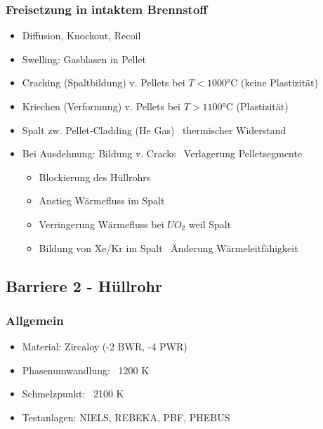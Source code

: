 \documentclass[12pt]{article}
\begin{document}
\subsubsection{Freisetzung in intaktem Brennstoff}
\begin{itemize}
	\item Diffusion, Knockout, Recoil
	\item Swelling: Gasblasen in Pellet
	\item Cracking (Spaltbildung) v. Pellets bei \(T < 1000\)°C (keine Plastizität)
	\item Kriechen (Verformung) v. Pellets bei \(T > 1100\)°C (Plastizität)
	\item Spalt zw. Pellet-Cladding (He Gas) \textrightarrow\ thermischer Widerstand
	\item Bei Ausdehnung: Bildung v. Cracks \textrightarrow\ Verlagerung Pelletsegmente
		\begin{itemize}
			\item Blockierung des Hüllrohrs
			\item Anstieg Wärmefluss im Spalt
			\item Verringerung Wärmefluss bei \(UO_2\) weil Spalt
			\item Bildung von Xe/Kr im Spalt \textrightarrow\ Änderung Wärmeleitfähigkeit
		\end{itemize}
\end{itemize}

\subsection{Barriere 2 - Hüllrohr}

\subsubsection{Allgemein}
\begin{itemize}
	\item Material: Zircaloy (-2 BWR, -4 PWR)
	\item Phasenumwandlung: ~1200 K
	\item Schmelzpunkt: ~2100 K
	\item Testanlagen: NIELS, REBEKA, PBF, PHEBUS
\end{itemize}
\end{document}
